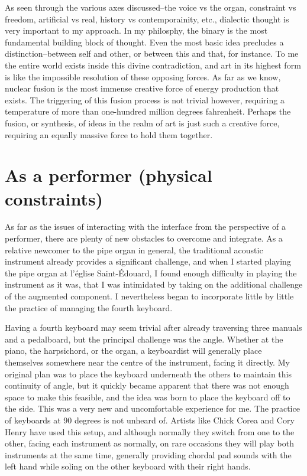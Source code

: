 \documentclass[12pt,twoside,maitrise]{dms_ks}
\theoremstyle{definition}
\begin{document}
As seen through the various axes discussed--the voice vs the organ, constraint vs freedom, artificial vs real, history vs contemporainity, etc., dialectic thought is very important to my approach.
In my philosphy, the binary is the most fundamental building block of thought.
Even the most basic idea precludes a distinction--between self and other, or between this and that, for instance.
To me the entire world exists inside this divine contradiction, and art in its highest form is like the impossible resolution of these opposing forces.
As far as we know, nuclear fusion is the most immense creative force of energy production that exists.
The triggering of this fusion process is not trivial however, requiring a temperature of more than one-hundred million degrees fahrenheit.
Perhaps the fusion, or synthesis, of ideas in the realm of art is just such a creative force, requiring an equally massive force to hold them together.

\section{As a performer (physical constraints)}
As far as the issues of interacting with the interface from the perspective of a performer, there are plenty of new obstacles to overcome and integrate. As a relative newcomer to the pipe organ in general, the traditional acoustic instrument already provides a significant challenge, and when I started playing the pipe organ at l’église Saint-Édouard, I found enough difficulty in playing the instrument as it was, that I was intimidated by taking on the additional challenge of the augmented component. I nevertheless began to incorporate little by little the practice of managing the fourth keyboard. 

Having a fourth keyboard may seem trivial after already traversing three manuals and a pedalboard, but the principal challenge was the angle. Whether at the piano, the harpsichord, or the organ, a keyboardist will generally place themselves somewhere near the centre of the instrument, facing it directly. My original plan was to place the keyboard underneath the others to maintain this continuity of angle, but it quickly became apparent that there was not enough space to make this feasible, and the idea was born to place the keyboard off to the side. This was a very new and uncomfortable experience for me. The practice of keyboards at 90 degrees is not unheard of. Artists like Chick Corea and Cory Henry have used this setup, and although normally they switch from one to the other, facing each instrument as normally, on rare occasions they will play both instruments at the same time, generally providing chordal pad sounds with the left hand while soling on the other keyboard with their right hands. 
\end{document}
